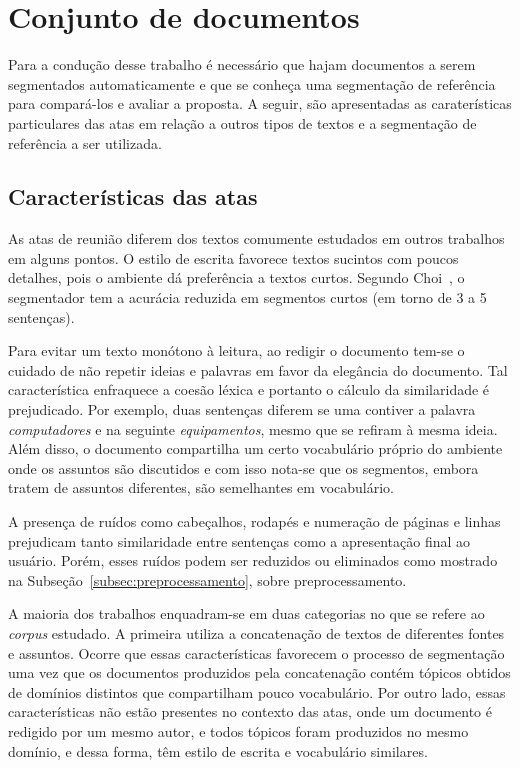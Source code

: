 
\section{Conjunto de documentos}
	\label{sec:conjutodedocumentos} 


	
Para a condução desse trabalho é necessário que hajam documentos a serem segmentados automaticamente e que se conheça uma segmentação de referência para compará-los e avaliar a proposta. A seguir, são apresentadas as caraterísticas particulares das atas em relação a outros tipos de textos e a segmentação de referência a ser utilizada.


\subsection{Características das atas}
	
	As atas de reunião diferem dos textos comumente estudados em outros trabalhos em alguns pontos. O estilo de escrita favorece textos sucintos com poucos detalhes, pois o ambiente dá preferência a textos curtos. Segundo Choi~\cite{Choi2001-LSA}, o segmentador tem a acurácia reduzida em segmentos curtos (em torno de 3 a 5 sentenças).
	
	Para evitar um texto monótono à leitura, ao redigir o documento tem-se o cuidado de não repetir ideias e palavras em favor da elegância do documento. Tal característica enfraquece a coesão léxica e portanto o cálculo da similaridade é prejudicado. Por exemplo, duas sentenças diferem se uma contiver a palavra \textit{computadores} e na seguinte \textit{equipamentos}, mesmo que se refiram à mesma ideia. Além disso, o documento compartilha um certo vocabulário próprio do ambiente onde os assuntos são discutidos e com isso nota-se que os segmentos, embora tratem de assuntos diferentes, são semelhantes em vocabulário.
	
A presença de ruídos como cabeçalhos, rodapés e numeração de páginas e linhas prejudicam tanto similaridade entre sentenças como a apresentação final ao usuário. Porém, esses ruídos podem ser reduzidos ou eliminados como mostrado na Subseção~\ref{subsec:preprocessamento}, sobre preprocessamento.



 
A maioria dos trabalhos enquadram-se em duas categorias no que se refere ao \textit{corpus} estudado.  
% 
%
A primeira utiliza a concatenação de textos de diferentes fontes e assuntos. 
Ocorre que essas características favorecem o processo de segmentação uma vez que os documentos produzidos pela concatenação contém tópicos obtidos de domínios distintos que compartilham pouco vocabulário. Por outro lado, essas características não estão presentes no contexto das atas, onde um documento é redigido por um mesmo autor, e todos tópicos foram produzidos no mesmo domínio, e dessa forma, têm estilo de escrita e vocabulário similares.


